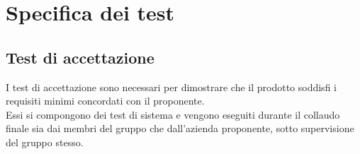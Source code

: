 \section{Specifica dei test}\label{section:specifica_test}

\subsection{Test di accettazione}\label{subsection:test_accettazione}
I test di accettazione sono necessari per dimostrare che il prodotto soddisfi i requisiti minimi concordati con il proponente. \\
Essi si compongono dei test di sistema e vengono eseguiti durante il collaudo finale sia dai membri del
gruppo che dall'azienda proponente, sotto supervisione del gruppo stesso.

